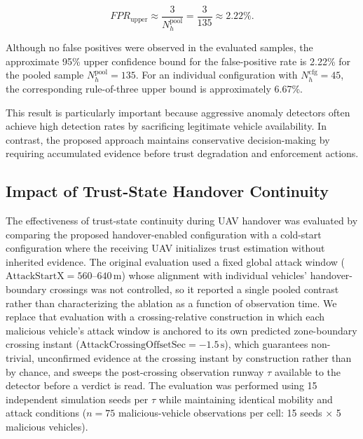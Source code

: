 \documentclass[journal]{IEEEtran}
\begin{document}
\begin{equation}
FPR_{\mathrm{upper}}
\approx
\frac{3}{N_h^{\mathrm{pool}}}
=
\frac{3}{135}
\approx 2.22\%.
\label{eq:fpr_upper_rule_three}
\end{equation}

Although no false positives were observed in the evaluated samples, the
approximate 95\% upper confidence bound for the false-positive rate is 2.22\%
for the pooled sample $N_h^{\mathrm{pool}}=135$. For an individual
configuration with $N_h^{\mathrm{cfg}}=45$, the corresponding rule-of-three
upper bound is approximately 6.67\%.

This result is particularly important because aggressive anomaly detectors
often achieve high detection rates by sacrificing legitimate vehicle
availability. In contrast, the proposed approach maintains conservative
decision-making by requiring accumulated evidence before trust degradation
and enforcement actions.

\subsection{Impact of Trust-State Handover Continuity}
\label{subsec:handover_results}

The effectiveness of trust-state continuity during UAV handover was
evaluated by comparing the proposed handover-enabled configuration with a
cold-start configuration where the receiving UAV initializes trust
estimation without inherited evidence. The original evaluation used a
fixed global attack window ($\mathrm{AttackStartX}{=}560$--$640\,\mathrm{m}$)
whose alignment with individual vehicles' handover-boundary crossings was
not controlled, so it reported a single pooled contrast rather than
characterizing the ablation as a function of observation time. We replace
that evaluation with a crossing-relative construction in which each
malicious vehicle's attack window is anchored to its own predicted
zone-boundary crossing instant
($\mathrm{AttackCrossingOffsetSec}{=}{-}1.5\,\mathrm{s}$), which guarantees
non-trivial, unconfirmed evidence at the crossing instant by construction
rather than by chance, and sweeps the post-crossing observation runway
$\tau$ available to the detector before a verdict is read. The evaluation
was performed using 15 independent simulation seeds per $\tau$ while
maintaining identical mobility and attack conditions ($n{=}75$
malicious-vehicle observations per cell: 15 seeds $\times$ 5 malicious
vehicles).
\end{document}

